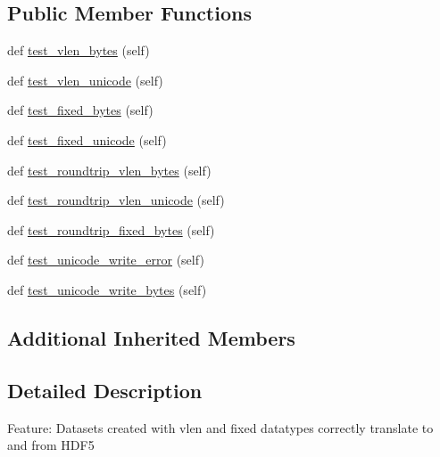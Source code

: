 \subsection*{Public Member Functions}
\begin{DoxyCompactItemize}
\item 
def \hyperlink{classh5py__LOCAL_1_1tests_1_1old_1_1test__dataset_1_1TestStrings_a1352ed4ed0246981bfc369e8f585efba}{test\+\_\+vlen\+\_\+bytes} (self)
\item 
def \hyperlink{classh5py__LOCAL_1_1tests_1_1old_1_1test__dataset_1_1TestStrings_a42ac52e132091bd3d0d3b9286623ed8f}{test\+\_\+vlen\+\_\+unicode} (self)
\item 
def \hyperlink{classh5py__LOCAL_1_1tests_1_1old_1_1test__dataset_1_1TestStrings_a4224e9a0e9a8e8184cae907699eabafd}{test\+\_\+fixed\+\_\+bytes} (self)
\item 
def \hyperlink{classh5py__LOCAL_1_1tests_1_1old_1_1test__dataset_1_1TestStrings_a5092bee15f878b4c4dc2a1384972494e}{test\+\_\+fixed\+\_\+unicode} (self)
\item 
def \hyperlink{classh5py__LOCAL_1_1tests_1_1old_1_1test__dataset_1_1TestStrings_aa4769deb5c2c829cb4fd538814876a21}{test\+\_\+roundtrip\+\_\+vlen\+\_\+bytes} (self)
\item 
def \hyperlink{classh5py__LOCAL_1_1tests_1_1old_1_1test__dataset_1_1TestStrings_af79af5821b6fc7f05803ea15620ad69a}{test\+\_\+roundtrip\+\_\+vlen\+\_\+unicode} (self)
\item 
def \hyperlink{classh5py__LOCAL_1_1tests_1_1old_1_1test__dataset_1_1TestStrings_ace46b960bb842be49daa8ee61c752656}{test\+\_\+roundtrip\+\_\+fixed\+\_\+bytes} (self)
\item 
def \hyperlink{classh5py__LOCAL_1_1tests_1_1old_1_1test__dataset_1_1TestStrings_aafcfa1dd2d5c37a50cb4abfbb1ef051b}{test\+\_\+unicode\+\_\+write\+\_\+error} (self)
\item 
def \hyperlink{classh5py__LOCAL_1_1tests_1_1old_1_1test__dataset_1_1TestStrings_a5fa3d1a47c4c7f9eccfe0304b2f91bb2}{test\+\_\+unicode\+\_\+write\+\_\+bytes} (self)
\end{DoxyCompactItemize}
\subsection*{Additional Inherited Members}


\subsection{Detailed Description}
\begin{DoxyVerb}    Feature: Datasets created with vlen and fixed datatypes correctly
    translate to and from HDF5
\end{DoxyVerb}
 


